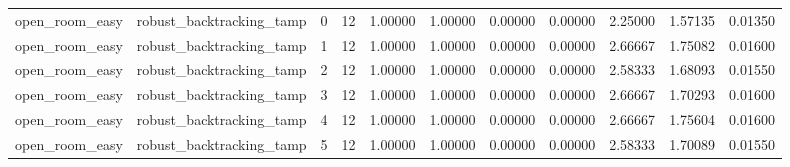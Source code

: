\documentclass{article}
\begin{document}
\begin{table}[tbp]
{\begin{tabular}{lllllllllll}
open\_room\_easy & robust\_backtracking\_tamp & 0 & 12 & 1.00000 & 1.00000 & 0.00000 & 0.00000 & 2.25000 & 1.57135 & 0.01350 \\
open\_room\_easy & robust\_backtracking\_tamp & 1 & 12 & 1.00000 & 1.00000 & 0.00000 & 0.00000 & 2.66667 & 1.75082 & 0.01600 \\
open\_room\_easy & robust\_backtracking\_tamp & 2 & 12 & 1.00000 & 1.00000 & 0.00000 & 0.00000 & 2.58333 & 1.68093 & 0.01550 \\
open\_room\_easy & robust\_backtracking\_tamp & 3 & 12 & 1.00000 & 1.00000 & 0.00000 & 0.00000 & 2.66667 & 1.70293 & 0.01600 \\
open\_room\_easy & robust\_backtracking\_tamp & 4 & 12 & 1.00000 & 1.00000 & 0.00000 & 0.00000 & 2.66667 & 1.75604 & 0.01600 \\
open\_room\_easy & robust\_backtracking\_tamp & 5 & 12 & 1.00000 & 1.00000 & 0.00000 & 0.00000 & 2.58333 & 1.70089 & 0.01550 \\
\bottomrule
\end{tabular}
}
\end{table}

\clearpage
\end{document}
